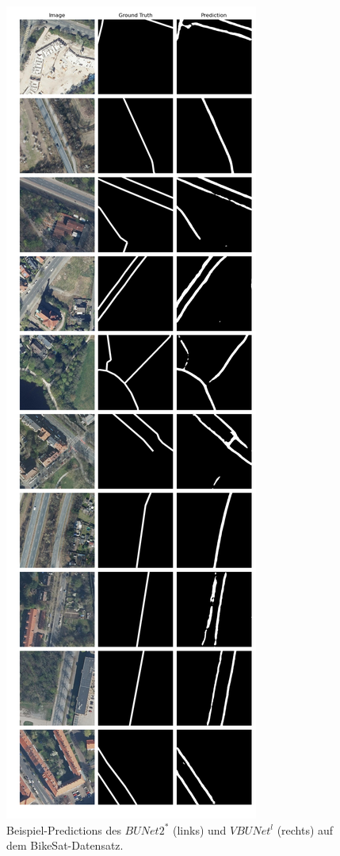 \begin{figure}
\begin{minipage}{.41\textwidth}
	\end{minipage}
	\begin{minipage}{.41\textwidth}
		\centering
		\includegraphics[width=1.\linewidth]{Bilder/Samples-Bikesat/vbunet-l.png}
	\end{minipage}

	\caption{Beispiel-Predictions des $BUNet2^*$ (links) und $VBUNet^l$ (rechts) auf dem BikeSat-Datensatz.}
	\label{fig:bikesat-samples-bunet2-s-vbunet-l}
\end{figure}

